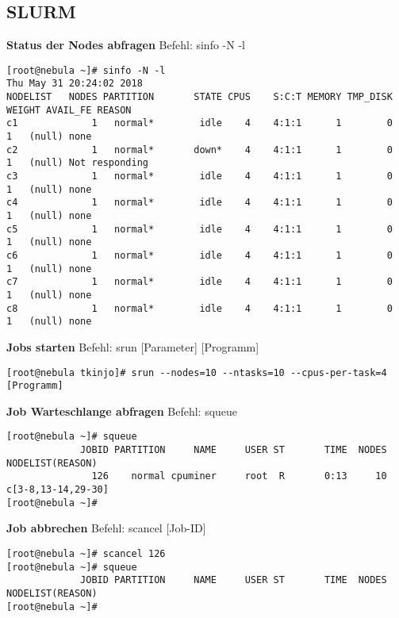 \subsection{SLURM}
\textbf{Status der Nodes abfragen}\newline
Befehl: sinfo -N -l
\begin{lstlisting}
[root@nebula ~]# sinfo -N -l
Thu May 31 20:24:02 2018
NODELIST   NODES PARTITION       STATE CPUS    S:C:T MEMORY TMP_DISK WEIGHT AVAIL_FE REASON
c1             1   normal*        idle    4    4:1:1      1        0      1   (null) none
c2             1   normal*       down*    4    4:1:1      1        0      1   (null) Not responding
c3             1   normal*        idle    4    4:1:1      1        0      1   (null) none
c4             1   normal*        idle    4    4:1:1      1        0      1   (null) none
c5             1   normal*        idle    4    4:1:1      1        0      1   (null) none
c6             1   normal*        idle    4    4:1:1      1        0      1   (null) none
c7             1   normal*        idle    4    4:1:1      1        0      1   (null) none
c8             1   normal*        idle    4    4:1:1      1        0      1   (null) none
\end{lstlisting}

\textbf{Jobs starten}\newline
Befehl: srun [Parameter] [Programm]
\begin{lstlisting}
[root@nebula tkinjo]# srun --nodes=10 --ntasks=10 --cpus-per-task=4 [Programm]
\end{lstlisting}

\textbf{Job Warteschlange abfragen}\newline
Befehl: squeue
\begin{lstlisting}
[root@nebula ~]# squeue
             JOBID PARTITION     NAME     USER ST       TIME  NODES NODELIST(REASON)
               126    normal cpuminer     root  R       0:13     10 c[3-8,13-14,29-30]
[root@nebula ~]#
\end{lstlisting}

\textbf{Job abbrechen}\newline
Befehl: scancel [Job-ID]
\begin{lstlisting}
[root@nebula ~]# scancel 126
[root@nebula ~]# squeue
             JOBID PARTITION     NAME     USER ST       TIME  NODES NODELIST(REASON)
[root@nebula ~]#
\end{lstlisting}

